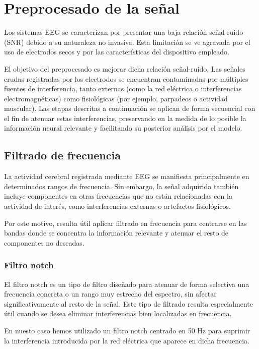 \section{Preprocesado de la señal}
\label{sec:preprocesado}

Los sistemas EEG se caracterizan por presentar una baja relación señal-ruido (SNR) debido a su naturaleza no invasiva. Esta limitación se ve agravada por el uso de electrodos secos y por las características del dispositivo empleado.

El objetivo del preprocesado es mejorar dicha relación señal-ruido. Las señales crudas registradas por los electrodos se encuentran contaminadas por múltiples fuentes de interferencia, tanto externas (como la red eléctrica o interferencias electromagnéticas) como fisiológicas (por ejemplo, parpadeos o actividad muscular). Las etapas descritas a continuación se aplican de forma secuencial con el fin de atenuar estas interferencias, preservando en la medida de lo posible la información neural relevante y facilitando su posterior análisis por el modelo.

\subsection{Filtrado de frecuencia}
\label{subsec:FiltradoFrecuencia}
La actividad cerebral registrada mediante EEG se manifiesta principalmente en determinados rangos de frecuencia. Sin embargo, la señal adquirida también incluye componentes en otras frecuencias que no están relacionadas con la actividad de interés, como interferencias externas o artefactos fisiológicos.

Por este motivo, resulta útil aplicar filtrado en frecuencia para centrarse en las bandas donde se concentra la información relevante y atenuar el resto de componentes no deseadas. 

\subsubsection{Filtro notch}

El filtro notch es un tipo de filtro diseñado para atenuar de forma selectiva una frecuencia concreta o un rango muy estrecho del espectro, sin afectar significativamente al resto de la señal. Este tipo de filtrado resulta especialmente útil cuando se desea eliminar interferencias bien localizadas en frecuencia.

En nuesto caso hemos utilizado un filtro notch centrado en 50 Hz para suprimir la interferencia introducida por la red eléctrica que aparece en dicha frecuencia.

